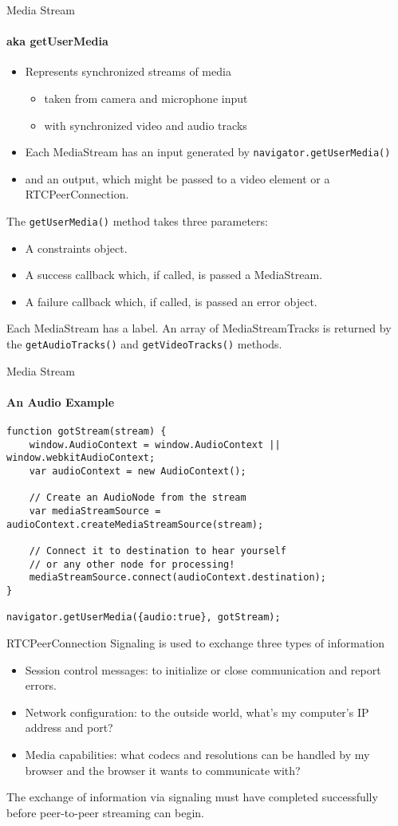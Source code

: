 \begin{frame}{Media Stream}\framesubtitle{aka getUserMedia}
\begin{itemize}
\item Represents synchronized streams of media
\begin{itemize}
\item taken from camera and microphone input
\item with synchronized video and audio tracks
\end{itemize}
\item Each MediaStream has an input generated by \texttt{navigator.getUserMedia()}
\item and an output, which might be passed to a video element or a RTCPeerConnection.
\end{itemize}

The \texttt{getUserMedia()} method takes three parameters:
\begin{itemize}
\item A constraints object.
\item A success callback which, if called, is passed a MediaStream.
\item A failure callback which, if called, is passed an error object.
\end{itemize}
Each MediaStream has a label. 
An array of MediaStreamTracks is returned by the \texttt{getAudioTracks()} and \texttt{getVideoTracks()} methods.
\end{frame}

\begin{frame}[containsverbatim]{Media Stream}\framesubtitle{An Audio Example}
\begin{lstlisting}
function gotStream(stream) {
    window.AudioContext = window.AudioContext || window.webkitAudioContext;
    var audioContext = new AudioContext();

    // Create an AudioNode from the stream
    var mediaStreamSource = audioContext.createMediaStreamSource(stream);

    // Connect it to destination to hear yourself
    // or any other node for processing!
    mediaStreamSource.connect(audioContext.destination);
}

navigator.getUserMedia({audio:true}, gotStream);
\end{lstlisting}
\end{frame}

\begin{frame}{RTCPeerConnection}
Signaling is used to exchange three types of information
\begin{itemize}
\item Session control messages: to initialize or close communication and report errors.
\item Network configuration: to the outside world, what's my computer's IP address and port?
\item Media capabilities: what codecs and resolutions can be handled by my browser and the browser it wants to communicate with?
\end{itemize}
The exchange of information via signaling must have completed successfully before peer-to-peer streaming can begin.
\end{frame}

